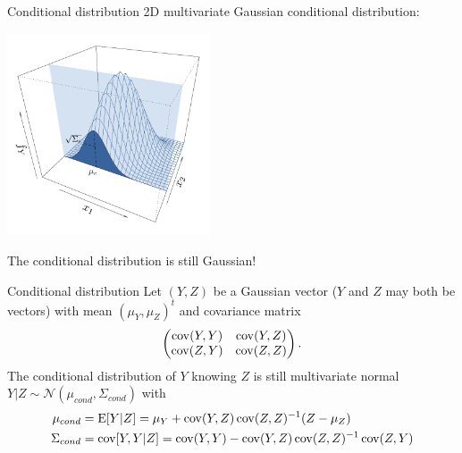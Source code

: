 \begin{frame}{}
\begin{block}{Conditional distribution}
2D multivariate Gaussian conditional distribution:\\
\begin{center}
\includegraphics[height=6cm]{1_stat_models/figures/ch1_condpdf1}
\end{center}
The conditional distribution is still Gaussian!
\end{block}
\end{frame}

\begin{frame}{}
\begin{block}{Conditional distribution}
Let $(Y,Z)$ be a Gaussian vector ($Y$ and $Z$ may both be vectors) with mean $(\mu_Y,\mu_Z)^t$ and covariance matrix
\begin{equation*}
\begin{pmatrix}
	\operatorname*{cov}(Y,Y) & \operatorname*{cov}(Y,Z)\\
	\operatorname*{cov}(Z,Y) & \operatorname*{cov}(Z,Z)\\
\end{pmatrix}.
\end{equation*}
The conditional distribution of $Y$ knowing $Z$ is still multivariate normal $Y|Z \sim \mathcal{N}(\mu_{cond},\Sigma_{cond})$ with
\begin{equation*}
\begin{split}
	\mu_{cond} &= \operatorname*{E} [Y|Z] = \mu_Y + \operatorname*{cov}(Y,Z) \operatorname*{cov}(Z,Z)^{-1} (Z-\mu_Z)\\
	\Sigma_{cond} &= \operatorname*{cov} [Y,Y|Z] = \operatorname*{cov}(Y,Y) - \operatorname*{cov}(Y,Z) \operatorname*{cov}(Z,Z)^{-1} \operatorname*{cov}(Z,Y)
\end{split}
\end{equation*}
\end{block}
\end{frame}

